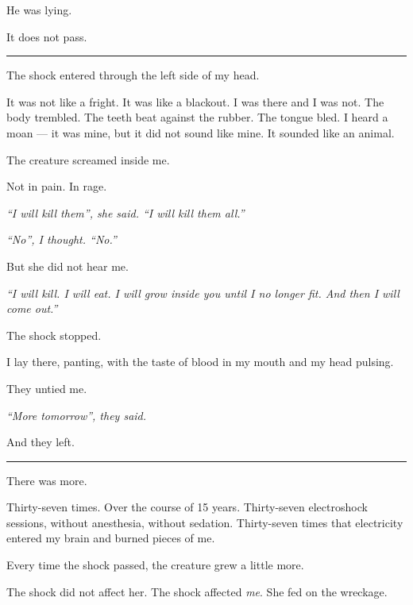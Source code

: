 \noindent He was lying.

\noindent It does not pass.

\vspace{0.5em}\noindent\rule{\textwidth}{0.5pt}\vspace{0.5em}

\noindent The shock entered through the left side of my head.

\noindent It was not like a fright. It was like a blackout. I was there and I was not. The body trembled. The teeth beat against the rubber. The tongue bled. I heard a moan --- it was mine, but it did not sound like mine. It sounded like an animal.

\noindent The creature screamed inside me.

\noindent Not in pain.
In rage.

\noindent \textit{\textquotedblleft{}I will kill them\textquotedblright{}\textit{, she said. }\textquotedblleft{}I will kill them all.\textquotedblright{}}

\noindent \textit{\textquotedblleft{}No\textquotedblright{}\textit{, I thought. }\textquotedblleft{}No.\textquotedblright{}}

\noindent But she did not hear me.

\noindent \textit{\textquotedblleft{}I will kill. I will eat. I will grow inside you until I no longer fit. And then I will come out.\textquotedblright{}}

\noindent The shock stopped.

\noindent I lay there, panting, with the taste of blood in my mouth and my head pulsing.

\noindent They untied me.

\noindent \textit{\textquotedblleft{}More tomorrow\textquotedblright{}, they said.}

\noindent And they left.

\vspace{0.5em}\noindent\rule{\textwidth}{0.5pt}\vspace{0.5em}

\noindent There was more.

\noindent Thirty-seven times. Over the course of 15 years. Thirty-seven electroshock sessions, without anesthesia, without sedation. Thirty-seven times that electricity entered my brain and burned pieces of me.

\noindent Every time the shock passed, the creature grew a little more.

\noindent The shock did not affect her.
The shock affected \textit{me}.
She fed on the wreckage.


